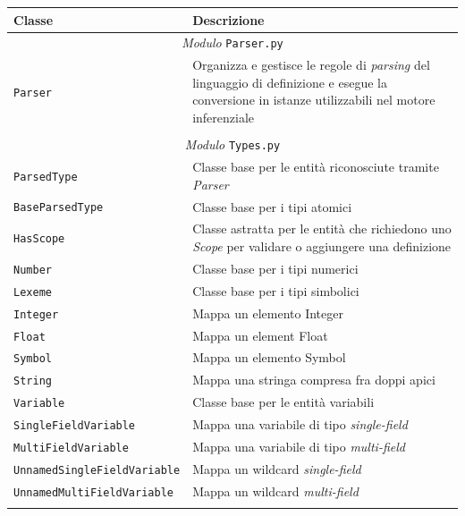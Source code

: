 \begin{longtable}{p{5.5cm}p{6.5cm}}
\hline 
\textbf{Classe} & \textbf{Descrizione} \\ 
\hline\hline 
\endhead

\multicolumn{2}{c}{\emph{Modulo} \texttt{Parser.py}}\\
	\hdashline[5pt/5pt]
		\texttt{Parser} & Organizza e gestisce le regole di \emph{parsing} del linguaggio di definizione e esegue la conversione in istanze utilizzabili nel motore inferenziale \\ 
	\hline\\

\multicolumn{2}{c}{\emph{Modulo} \texttt{Types.py}}\\
	\hdashline[5pt/5pt]
		\texttt{ParsedType} & Classe base per le entità riconosciute tramite \emph{Parser}\\ 
	\hdashline[1pt/5pt]
		\texttt{BaseParsedType} & Classe base per i tipi atomici\\ 
	\hdashline[1pt/5pt]
		\texttt{HasScope} & Classe astratta per le entità che richiedono uno \emph{Scope} per validare o aggiungere una definizione\\ 
	\hdashline[1pt/5pt]
		\texttt{Number} & Classe base per i tipi numerici\\ 
	\hdashline[1pt/5pt]
		\texttt{Lexeme} & Classe base per i tipi simbolici\\
	\hdashline[1pt/5pt]
		\texttt{Integer} & Mappa un elemento Integer\\
	\hdashline[1pt/5pt]
		\texttt{Float} & Mappa un element Float\\ 
	\hdashline[1pt/5pt]
		\texttt{Symbol} & Mappa un elemento Symbol\\ 
	\hdashline[1pt/5pt]
		\texttt{String} & Mappa una stringa compresa fra doppi apici\\ 
	\hdashline[1pt/5pt]
		\texttt{Variable} & Classe base per le entità variabili\\ 	
	\hdashline[1pt/5pt]
		\texttt{SingleFieldVariable} & Mappa una variabile di tipo \emph{single-field}\\ 
	\hdashline[1pt/5pt]
		\texttt{MultiFieldVariable} & Mappa una variabile di tipo \emph{multi-field}\\ 
	\hdashline[1pt/5pt]
		\texttt{UnnamedSingleFieldVariable} & Mappa un wildcard \emph{single-field}\\
	\hdashline[1pt/5pt]
		\texttt{UnnamedMultiFieldVariable} & Mappa un wildcard \emph{multi-field}\\ 
	\hdashline[1pt/5pt]

\end{longtable}
